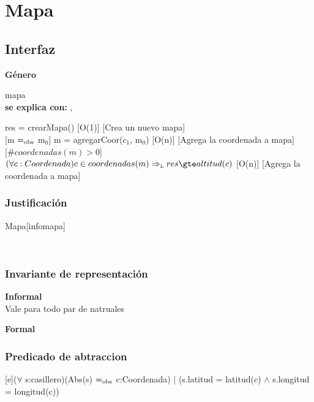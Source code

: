 \section{Mapa}


\subsection{Interfaz}

\parbox {1,7cm}{{\bf Género}} mapa\\
{\bf se explica con:}  , \\
\medskip

{res = crearMapa()}
[O(1)]
[Crea un nuevo mapa]
\\

[m $=_{\mathrm{obs}}$ m$_0$]
{m = agregarCoor($c_1$, m$_0$)}
[O(n)]
[Agrega la coordenada a mapa]
\\

[$\#coordenadas(m) > 0$]
{$(\forall c: Coordenada) c \in coordenadas(m) \impluego res \gte altitud(c)$}
[O(n)]
[Agrega la coordenada a mapa]
\\


\begin{Representacion}
\subsubsection{Justificación}
	\begin{Estructura}{Mapa}[infomapa]
		\begin{Tupla}[infomapa]
			\\
		\end{Tupla}
	\end{Estructura}
	
\subsubsection{Invariante de representación}

\textbf{Informal}\\

Vale para todo par de natruales

\textbf{Formal}\\


\subsubsection{Predicado de abtraccion}

[e]{($\forall$ s:casillero)(Abs(s) $=_{\mathrm{obs}}$ c:Coordenada) | (s.latitud = latitud(c) $\wedge$ s.longitud = longitud(c))}

\end{Representacion}

